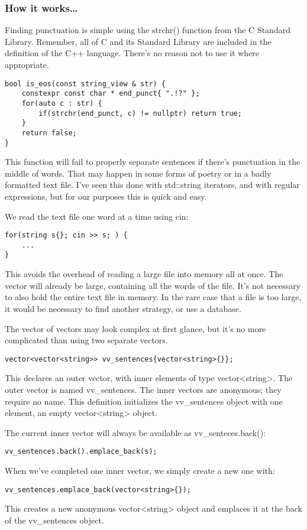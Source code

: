 \subsubsection{How it works…}

Finding punctuation is simple using the strchr() function from the C Standard Library. Remember, all of C and its Standard Library are included in the definition of the C++ language. There's no reason not to use it where appropriate.

\begin{lstlisting}[style=styleCXX]
bool is_eos(const string_view & str) {
	constexpr const char * end_punct{ ".!?" };
	for(auto c : str) {
		if(strchr(end_punct, c) != nullptr) return true;
	}
	return false;
}
\end{lstlisting}

This function will fail to properly separate sentences if there's punctuation in the middle of words. That may happen in some forms of poetry or in a badly formatted text file. I've seen this done with std::string iterators, and with regular expressions, but for our purposes this is quick and easy.

We read the text file one word at a time using cin:

\begin{lstlisting}[style=styleCXX]
for(string s{}; cin >> s; ) {
	...
}
\end{lstlisting}

This avoids the overhead of reading a large file into memory all at once. The vector will already be large, containing all the words of the file. It's not necessary to also hold the entire text file in memory. In the rare case that a file is too large, it would be necessary to find another strategy, or use a database.

The vector of vectors may look complex at first glance, but it's no more complicated than using two separate vectors.

\begin{lstlisting}[style=styleCXX]
vector<vector<string>> vv_sentences{vector<string>{}};
\end{lstlisting}

This declares an outer vector, with inner elements of type vector<string>. The outer vector is named vv\_sentences. The inner vectors are anonymous; they require no name. This definition initializes the vv\_sentences object with one element, an empty vector<string> object.

The current inner vector will always be available as vv\_senteces.back():

\begin{lstlisting}[style=styleCXX]
vv_sentences.back().emplace_back(s);
\end{lstlisting}

When we've completed one inner vector, we simply create a new one with:

\begin{lstlisting}[style=styleCXX]
vv_sentences.emplace_back(vector<string>{});
\end{lstlisting}

This creates a new anonymous vector<string> object and emplaces it at the back of the vv\_sentences object.

